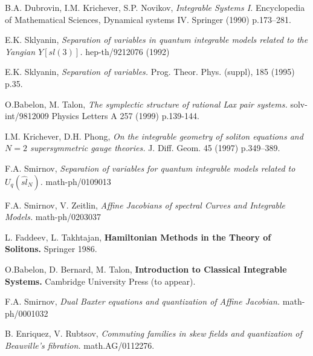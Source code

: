 \documentclass[a4paper,11pt]{article}
\begin{document}
\begin{thebibliography}{XXXXX}

 B.A. Dubrovin, I.M. Krichever, S.P. Novikov,
{\it Integrable Systems I.} Encyclopedia of Mathematical Sciences, 
Dynamical systems IV. Springer (1990) p.173--281.


 E.K. Sklyanin, {\it Separation of variables
in quantum integrable models related to the Yangian $Y[sl(3)]$.}
hep-th/9212076 (1992)

 E.K. Sklyanin, {\it Separation of variables.}
Prog. Theor. Phys. (suppl), 185 (1995) p.35.

 O.Babelon, M. Talon, {\it The symplectic
structure of rational Lax pair systems.}
solv-int/9812009 Physics Letters A 257 (1999) p.139-144.

 I.M. Krichever, D.H. Phong, {\it On the
integrable geometry of soliton equations and $N=2$ supersymmetric
gauge theories.} J. Diff. Geom. 45 (1997) p.349--389.

 F.A. Smirnov, {\it Separation of variables
for quantum integrable models related to $U_q(\hat{sl}_N)$.}
math-ph/0109013

  F.A. Smirnov, V. Zeitlin, {\it Affine Jacobians of spectral Curves
and Integrable Models.} math-ph/0203037

 L. Faddeev, L. Takhtajan, {\bf Hamiltonian Methods in the Theory
of Solitons.} Springer 1986.

 O.Babelon, D. Bernard, M. Talon, {\bf Introduction to Classical Integrable Systems.} Cambridge University Press  (to appear).

 F.A. Smirnov, {\it Dual Baxter equations and quantization of Affine Jacobian.}
math-ph/0001032

 B. Enriquez, V. Rubtsov, {\it Commuting families in skew fields and
quantization of Beauville's fibration.} math.AG/0112276.


\end{thebibliography}
 
\end{document}
